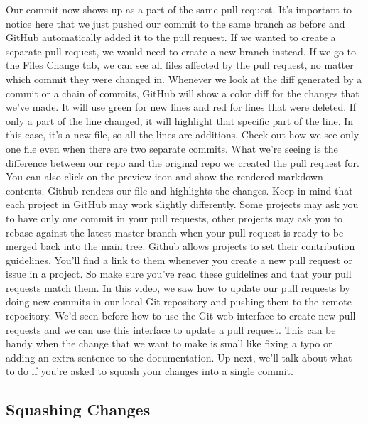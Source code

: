 	Our commit now shows up as a part of the same pull request. It's important to notice here that we just pushed our commit to the same branch as before and GitHub automatically added it to the pull request. If we wanted to create a separate pull request, we would need to create a new branch instead. If we go to the Files Change tab, we can see all files affected by the pull request, no matter which commit they were changed in. Whenever we look at the diff generated by a commit or a chain of commits, GitHub will show a color diff for the changes that we've made. It will use green for new lines and red for lines that were deleted. If only a part of the line changed, it will highlight that specific part of the line. In this case, it's a new file, so all the lines are additions. Check out how we see only one file even when there are two separate commits. What we're seeing is the difference between our repo and the original repo we created the pull request for. You can also click on the preview icon and show the rendered markdown contents. Github renders our file and highlights the changes. Keep in mind that each project in GitHub may work slightly differently. Some projects may ask you to have only one commit in your pull requests, other projects may ask you to rebase against the latest master branch when your pull request is ready to be merged back into the main tree. Github allows projects to set their contribution guidelines. You'll find a link to them whenever you create a new pull request or issue in a project. So make sure you've read these guidelines and that your pull requests match them. In this video, we saw how to update our pull requests by doing new commits in our local Git repository and pushing them to the remote repository. We'd seen before how to use the Git web interface to create new pull requests and we can use this interface to update a pull request. This can be handy when the change that we want to make is small like fixing a typo or adding an extra sentence to the documentation. Up next, we'll talk about what to do if you're asked to squash your changes into a single commit.
	
	\subsection{Squashing Changes}
	
